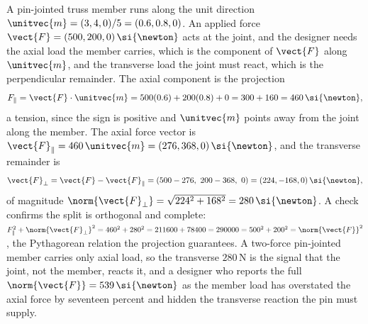 \begin{example}
A pin-jointed truss member runs along the unit direction
$\unitvec{m} = (3, 4, 0)/5 = (0.6, 0.8, 0)$. An applied force
$\vect{F} = (500, 200, 0)\,\si{\newton}$ acts at the joint, and the
designer needs the axial load the member carries, which is the
component of $\vect{F}$ along $\unitvec{m}$, and the transverse load
the joint must react, which is the perpendicular remainder. The axial
component is the projection
\[
F_{\parallel} = \vect{F}\cdot\unitvec{m} = 500(0.6) + 200(0.8) + 0
= 300 + 160 = 460\,\si{\newton},
\]
a tension, since the sign is positive and $\unitvec{m}$ points away
from the joint along the member. The axial force vector is
$\vect{F}_{\parallel} = 460\,\unitvec{m} = (276, 368, 0)\,\si{\newton}$,
and the transverse remainder is
\[
\vect{F}_{\perp} = \vect{F} - \vect{F}_{\parallel} = (500 - 276,\
200 - 368,\ 0) = (224, -168, 0)\,\si{\newton},
\]
of magnitude $\norm{\vect{F}_{\perp}} = \sqrt{224^{2} + 168^{2}} =
280\,\si{\newton}$. A check confirms the split is orthogonal and
complete: $F_{\parallel}^{2} + \norm{\vect{F}_{\perp}}^{2} =
460^{2} + 280^{2} = 211600 + 78400 = 290000 = 500^{2} + 200^{2} =
\norm{\vect{F}}^{2}$, the Pythagorean relation the projection
guarantees. A two-force pin-jointed member carries only axial load, so
the transverse $280\,\si{\newton}$ is the signal that the joint, not
the member, reacts it, and a designer who reports the full
$\norm{\vect{F}} = 539\,\si{\newton}$ as the member load has
overstated the axial force by seventeen percent and hidden the
transverse reaction the pin must supply.
\end{example}

